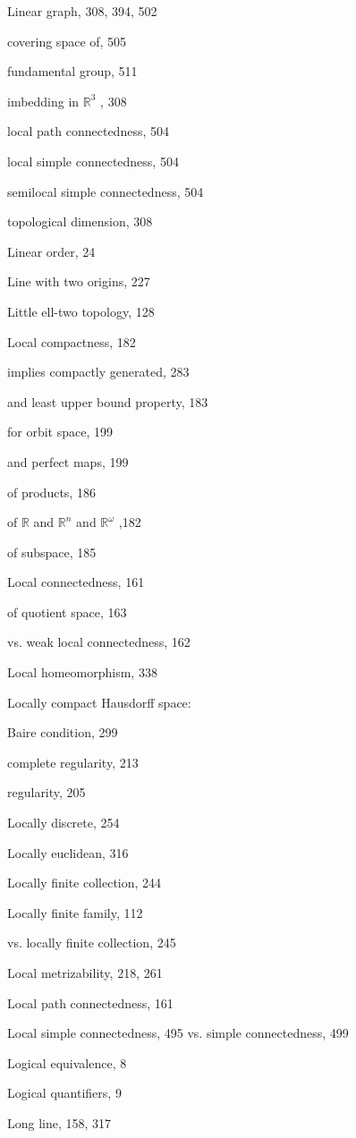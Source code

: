 Linear graph, 308, 394, 502

covering space of, 505

fundamental group, 511

imbedding in \({\mathbb{R}}^{3}\) , 308

local path connectedness, 504

local simple connectedness, 504

semilocal simple connectedness, 504

topological dimension, 308

Linear order, 24

Line with two origins, 227

Little ell-two topology, 128

Local compactness, 182

implies compactly generated, 283

and least upper bound property, 183

for orbit space, 199

and perfect maps, 199

of products, 186

of \(\mathbb{R}\) and \({\mathbb{R}}^{n}\) and \({\mathbb{R}}^{\omega }\) ,182

of subspace, 185

Local connectedness, 161

of quotient space, 163

vs. weak local connectedness, 162

Local homeomorphism, 338

Locally compact Hausdorff space:

Baire condition, 299

complete regularity, 213

regularity, 205

Locally discrete, 254

Locally euclidean, 316

Locally finite collection, 244

Locally finite family, 112

vs. locally finite collection, 245

Local metrizability, 218, 261

Local path connectedness, 161

Local simple connectedness, 495 vs. simple connectedness, 499

Logical equivalence, 8

Logical quantifiers, 9

Long line, 158, 317

